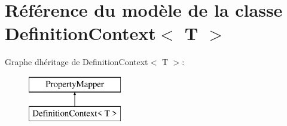 \hypertarget{class_definition_context}{}\section{Référence du modèle de la classe Definition\+Context$<$ T $>$}
\label{class_definition_context}
Graphe d\textquotesingle{}héritage de Definition\+Context$<$ T $>$\+:\begin{figure}[H]
\begin{center}
\leavevmode
\includegraphics[height=2.000000cm]{class_definition_context}
\end{center}
\end{figure}
